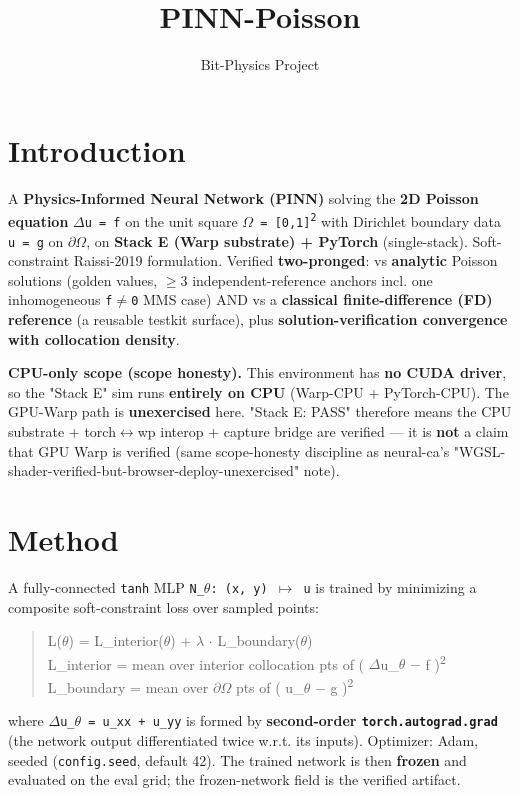 \documentclass{bitphysics-preprint}
\title{PINN-Poisson}
\author{Bit-Physics Project}
\date{}
\begin{document}
\maketitle

\section{Introduction}
A \textbf{Physics-Informed Neural Network (PINN)} solving the \textbf{2D Poisson equation} \texttt{$\Delta$u = f} on the unit square \texttt{$\Omega$ = [0,1]\textsuperscript{2}} with Dirichlet boundary data \texttt{u = g} on \texttt{$\partial$$\Omega$}, on \textbf{Stack E (Warp substrate) + PyTorch} (single-stack). Soft-constraint Raissi-2019 formulation. Verified \textbf{two-pronged}: vs \textbf{analytic} Poisson solutions (golden values, $\geq$3 independent-reference anchors incl. one inhomogeneous \texttt{f$\neq$0} MMS case) AND vs a \textbf{classical finite-difference (FD) reference} (a reusable testkit surface), plus \textbf{solution-verification convergence with collocation density}.

\textbf{CPU-only scope (scope honesty).} This environment has \textbf{no CUDA driver}, so the "Stack E" sim runs \textbf{entirely on CPU} (Warp-CPU + PyTorch-CPU). The GPU-Warp path is \textbf{unexercised} here. "Stack E: PASS" therefore means the CPU substrate + torch$\leftrightarrow$wp interop + capture bridge are verified --- it is \textbf{not} a claim that GPU Warp is verified (same scope-honesty discipline as neural-ca's "WGSL-shader-verified-but-browser-deploy-unexercised" note).

\section{Method}
A fully-connected \texttt{tanh} MLP \texttt{N\_$\theta$: (x, y) $\mapsto$ u} is trained by minimizing a composite soft-constraint loss over sampled points:

\begin{quote}\small\ttfamily\setlength{\parindent}{0pt}\noindent
L($\theta$) = L\_interior($\theta$) + $\lambda$ $\cdot$ L\_boundary($\theta$) \\
L\_interior = mean over interior collocation pts of ( $\Delta$u\_$\theta$ $-$ f )\textsuperscript{2} \\
L\_boundary = mean over $\partial$$\Omega$ pts of ( u\_$\theta$ $-$ g )\textsuperscript{2}
\end{quote}

where \texttt{$\Delta$u\_$\theta$ = u\_xx + u\_yy} is formed by \textbf{second-order \texttt{torch.autograd.grad}} (the network output differentiated twice w.r.t. its inputs). Optimizer: Adam, seeded (\texttt{config.seed}, default 42). The trained network is then \textbf{frozen} and evaluated on the eval grid; the frozen-network field is the verified artifact.
\end{document}
